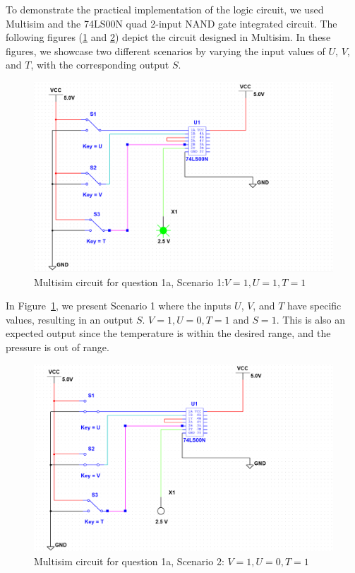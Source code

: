 \documentclass[a4paper,12]{article}
\begin{document}
To demonstrate the practical implementation of the logic circuit, we used Multisim and the 74LS00N quad 2-input NAND gate integrated circuit. The following figures (\ref{fig:1aa} and \ref{fig:1ab}) depict the circuit designed in Multisim. In these figures, we showcase two different scenarios by varying the input values of $U$, $V$, and $T$, with the corresponding output $S$.

\begin{figure}[H]
    \centering
    \includegraphics[width=\textwidth]{q1m1.png}
    \caption{Multisim circuit for question 1a, Scenario 1:$ V = 1, U = 1, T = 1$}
    \label{fig:1aa}
\end{figure}
In Figure~\ref{fig:1aa}, we present Scenario 1 where the inputs $U$, $V$, and $T$ have specific values, resulting in an output $S$.  $V=1,U=0,T=1$ and $S=1$. This is also an expected output since the temperature is within the desired range, and the pressure is  out of range.


\begin{figure}[H]
    \centering
    \includegraphics[width=\textwidth]{q1m2.png}
    \caption{Multisim circuit for question 1a, Scenario 2: $V=1,U=0,T=1$}
    \label{fig:1ab}
\end{figure}
\end{document}
